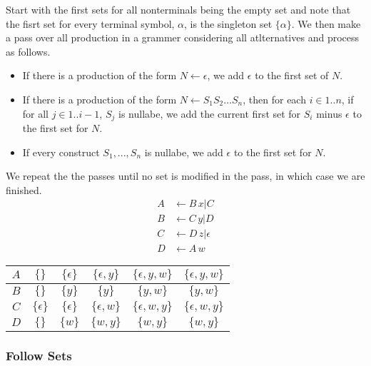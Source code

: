 Start with the first sets for all nonterminals being the empty set and note that the fisrt set for every terminal symbol, $\alpha$, is the singleton set $\{\alpha\}$.
We then make a pass over all production in a grammer considering all atlternatives and process as follows.
\begin{itemize}
    \item If there is a production of the form $N \leftarrow \epsilon$, we add $\epsilon$ to the first set of $N$.
    \item If there is a production of the form $N \leftarrow S_1 S_2 \dots S_n$, then for each $i \in 1..n$, if for all $j \in 1..i-1$, $S_j$ is nullabe, we add the current first set for $S_i$ minus $\epsilon$ to the first set for $N$.
    \item If every construct $S_1,...,S_n$ is nullabe, we add $\epsilon$ to the first set for $N$. 
\end{itemize}
We repeat the the passes until no set is modified in the pass, in which case we are finished.
\begin{align}
    A &\leftarrow B\,x | C\\
    B &\leftarrow C\,y | D\\
    C &\leftarrow D\,z | \epsilon\\
    D &\leftarrow A\,w
\end{align}
\begin{center}
\begin{tabular}{|c|c|c|c|c|c|}
    \hline
    $A$ & $\{\}$ & $\{\epsilon\}$ & $\{\epsilon,y\}$ &  $\{\epsilon,y,w\}$ &  $\{\epsilon,y,w\}$\\
    \hline
    $B$ & $\{\}$ & $\{y\}$ & $\{y\}$ &  $\{y,w\}$ &  $\{y,w\}$\\
    \hline
    $C$ & $\{\epsilon\}$ & $\{\epsilon\}$ & $\{\epsilon,w\}$ &  $\{\epsilon,w,y\}$ &  $\{\epsilon,w,y\}$\\
    \hline
    $D$ & $\{\}$ & $\{w\}$ & $\{w,y\}$ &  $\{w,y\}$ &  $\{w,y\}$\\
    \hline
\end{tabular}
\end{center}



\subsubsection{Follow Sets}
